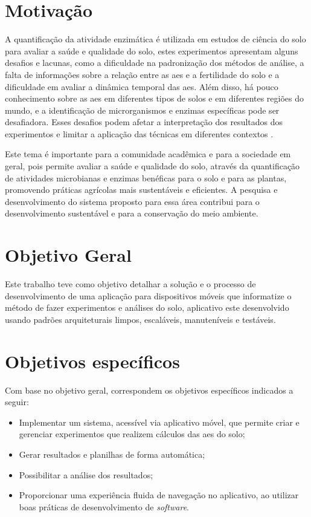 \section[Motivação]{Motivação}
A quantificação da atividade enzimática é  utilizada em estudos de ciência do solo para avaliar a saúde e qualidade do solo, estes experimentos apresentam alguns desafios e lacunas, como a dificuldade na padronização dos métodos de análise, a falta de informações sobre a relação entre as \acp{ae} e a fertilidade do solo e a dificuldade em avaliar a dinâmica temporal das \acp{ae}. Além disso, há pouco conhecimento sobre as \acp{ae} em diferentes tipos de solos e em diferentes regiões do mundo, e a identificação de microrganismos e enzimas específicas pode ser desafiadora. Esses desafios podem afetar a interpretação dos resultados dos experimentos e limitar a aplicação das técnicas em diferentes contextos \cite{cheviron_soil_2021}.

Este tema é importante para a comunidade acadêmica e para a sociedade em geral, pois permite avaliar a saúde e qualidade do solo, através da quantificação de atividades microbianas e enzimas benéficas para o solo e para as plantas, promovendo práticas agrícolas mais sustentáveis e eficientes. A pesquisa e desenvolvimento do sistema proposto para essa área contribui para o desenvolvimento sustentável e para a conservação do meio ambiente.
 
\section{Objetivo Geral}\label{sec:objetivo_geral}

Este trabalho teve como objetivo detalhar a solução e o processo de desenvolvimento de uma aplicação para dispositivos móveis que informatize o método de fazer experimentos e análises do solo, aplicativo este desenvolvido usando padrões arquiteturais limpos, escaláveis, manuteníveis e testáveis.

\section{Objetivos específicos}\label{sec:objetivo_específico}
Com base no objetivo geral, correspondem os objetivos específicos indicados a seguir:

\begin{itemize}
    \item Implementar um sistema, acessível via aplicativo móvel, que permite criar e gerenciar experimentos que realizem cálculos das \acp{ae} do solo;
    \item Gerar resultados e planilhas de forma automática;
    \item Possibilitar a análise dos resultados;
    \item Proporcionar uma experiência fluida de navegação no aplicativo, ao utilizar boas práticas de desenvolvimento de \textit{software}.
\end{itemize}

